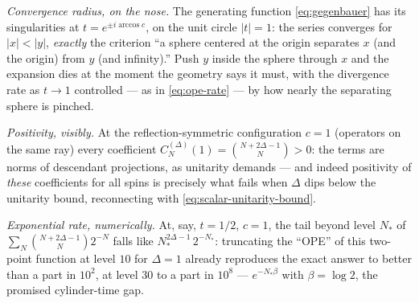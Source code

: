 \begin{eexample}
\emph{Convergence radius, on the nose.} The generating function
\eqref{eq:gegenbauer} has its singularities at $t = e^{\pm i \arccos c}$, on
the unit circle $|t| = 1$: the series converges for $|x| < |y|$,
\emph{exactly} the criterion ``a sphere centered at the origin separates $x$
(and the origin) from $y$ (and infinity).'' Push $y$ inside the sphere
through $x$ and the expansion dies at the moment the geometry says it must,
with the divergence rate as $t \to 1$ controlled --- as in
\eqref{eq:ope-rate} --- by how nearly the separating sphere is pinched.

\emph{Positivity, visibly.} At the reflection-symmetric configuration $c = 1$
(operators on the same ray) every coefficient $C_N^{(\Delta)}(1) =
\binom{N + 2\Delta - 1}{N} > 0$: the terms are norms of descendant
projections, as unitarity demands --- and indeed positivity of \emph{these}
coefficients for all spins is precisely what fails when $\Delta$ dips below
the unitarity bound, reconnecting with \eqref{eq:scalar-unitarity-bound}.

\emph{Exponential rate, numerically.} At, say, $t = 1/2$, $c = 1$, the tail
beyond level $N_*$ of $\sum_N \binom{N+2\Delta-1}{N} 2^{-N}$ falls like
$N_*^{2\Delta - 1}\, 2^{-N_*}$: truncating the ``OPE'' of this two-point
function at level $10$ for $\Delta = 1$ already reproduces the exact answer
to better than a part in $10^2$, at level $30$ to a part in $10^8$ ---
$e^{-N_* \beta}$ with $\beta = \log 2$, the promised cylinder-time gap.
\end{eexample}

